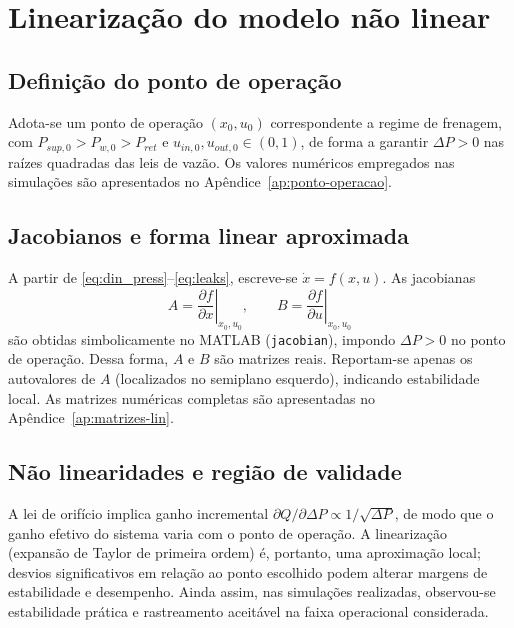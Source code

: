 \section{Linearização do modelo não linear}
\label{sec:controle-linearizacao-2p}



\subsection{Definição do ponto de operação}
\label{sec:definicao-ponto-operacao}
Adota-se um ponto de operação $(x_0,u_0)$ correspondente a regime de frenagem, com $P_{sup,0}>P_{w,0}>P_{ret}$ e $u_{in,0},u_{out,0}\in(0,1)$, de forma a garantir $\Delta P>0$ nas raízes quadradas das leis de vazão. Os valores numéricos empregados nas simulações são apresentados no Apêndice~\ref{ap:ponto-operacao}.
\subsection{Jacobianos e forma linear aproximada}
\label{sec:derivacao-matrizes-jacobianas}
A partir de \eqref{eq:din_press}–\eqref{eq:leaks}, escreve-se $\dot{x}=f(x,u)$. As jacobianas
\[
    A=\left.\frac{\partial f}{\partial x}\right|_{x_0,u_0},
    \qquad
    B=\left.\frac{\partial f}{\partial u}\right|_{x_0,u_0}
\]
são obtidas simbolicamente no MATLAB (\texttt{jacobian}), impondo $\Delta P>0$ no ponto de operação. Dessa forma, $A$ e $B$ são matrizes reais. Reportam-se apenas os autovalores de $A$ (localizados no semiplano esquerdo), indicando estabilidade local. As matrizes numéricas completas são apresentadas no Apêndice~\ref{ap:matrizes-lin}.
\subsection{Não linearidades e região de validade}
A lei de orifício implica ganho incremental $\partial Q/\partial \Delta P \propto 1/\sqrt{\Delta P}$, de modo que o ganho efetivo do sistema varia com o ponto de operação. A linearização (expansão de Taylor de primeira ordem) é, portanto, uma aproximação local; desvios significativos em relação ao ponto escolhido podem alterar margens de estabilidade e desempenho. Ainda assim, nas simulações realizadas, observou-se estabilidade prática e rastreamento aceitável na faixa operacional considerada.
